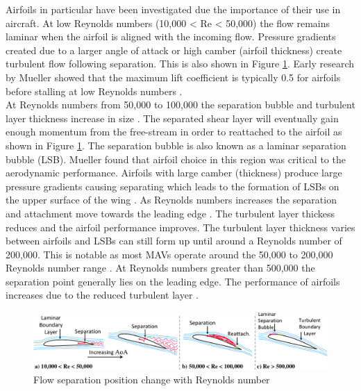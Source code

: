 Airfoils in particular have been investigated due the importance of their use in aircraft. At low Reynolds numbers (10,000 < Re < 50,000) the flow remains laminar when the airfoil is aligned with the incoming flow. Pressure gradients created due to a larger angle of attack or high camber (airfoil thickness) create turbulent flow following separation. This is also shown in Figure \ref{fig:Re3}. Early research by Mueller showed that the maximum lift coefficient is typically 0.5 for airfoils before stalling at low Reynolds numbers \cite{Mueller1985}. \\
At Reynolds numbers from 50,000 to 100,000 the separation bubble and turbulent layer thickness increase in size \cite{Winslow2018}. The separated shear layer will eventually gain enough momentum from the free-stream in order to reattached to the airfoil as shown in Figure \ref{fig:Re3}. The separation bubble is also known as a laminar separation bubble (\acrshort{LSB}). Mueller found that airfoil choice in this region was critical to the aerodynamic performance. Airfoils with large camber (thickness) produce large pressure gradients causing separating which leads to the formation of \acrshort{LSB}s on the upper surface of the wing \cite{Mueller1985}. As Reynolds numbers increases the separation and attachment move towards the leading edge \cite{Winslow2018}. The turbulent layer thickess reduces and the airfoil performance improves. The turbulent layer thickness varies between airfoils and \acrshort{LSB}s can still form up until around a Reynolds number of 200,000. This is notable as most \acrshort{MAV}s operate around the 50,000 to 200,000 Reynolds number range \cite{Cosyn2006}. At Reynolds numbers greater than 500,000 the separation point generally lies on the leading edge. The performance of airfoils increases due to the reduced turbulent layer \cite{Winslow2018}. %

\begin{figure}[H]
    \centering
    \includegraphics[width = \linewidth]{02_Background/Figs/airfoil.jpeg}
   \caption{Flow separation position change with Reynolds number \cite{Winslow2018}}
    \label{fig:Re3}
\end{figure}

